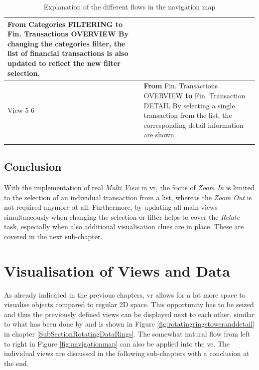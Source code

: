 \begin{longtable}{ | p{2.5cm} | p{11.5cm} |}
	\textbf{From} Categories FILTERING \textbf{to} Fin. Transactions OVERVIEW \newline
	By changing the categories filter, the list of financial transactions is also updated to reflect the new filter selection. \\
	\hline
	View 5 \textrightarrow{} 6 &
	\textbf{From} Fin. Transactions OVERVIEW \textbf{to} Fin. Transaction DETAIL \newline
	By selecting a single transaction from the list, the corresponding detail information are shown. \\
	\hline
	\caption{Explanation of the different flows in the navigation map}
	\label{tbl:navigationmap}
\end{longtable}



\subsection{Conclusion}

With the implementation of real \textit{Multi View} in \gls{vr}, the focus of \textit{Zoom In} is limited to the selection of an individual transaction from a list, whereas the \textit{Zoom Out} is not required anymore at all. Furthermore, by updating all main views simultaneously when changing the selection or filter helps to cover the \textit{Relate} task, especially when also additional visualisation clues are in place. These are covered in the next sub-chapter.



\section{Visualisation of Views and Data}

As already indicated in the previous chapters, \gls{vr} allows for a lot more space to visualise objects compared to regular 2D space. This opportunity has to be seized and thus the previously defined views can be displayed next to each other, similar to what has been done by \cite{CodeScience2015} and is shown in Figure \ref{fig:rotatingringstoweranddetail} in chapter \ref{SubSectionRotatingDataRings}. The somewhat natural flow from left to right in Figure \ref{fig:navigationmap} can also be applied into the \gls{ve}. \newline
The individual views are discussed in the following sub-chapters with a conclusion at the end.


